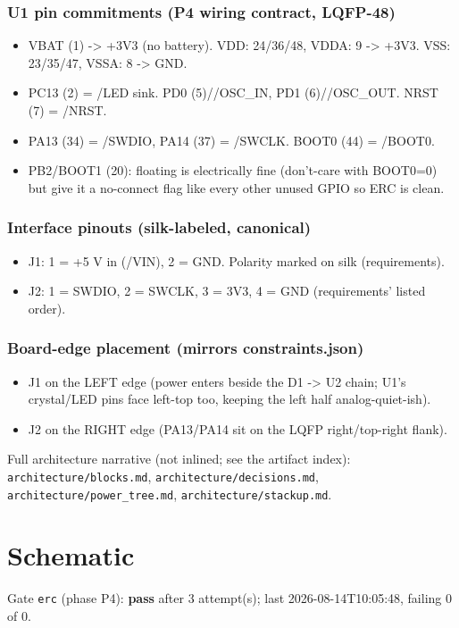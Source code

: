 \documentclass[11pt,a4paper]{article}
\begin{document}
\subsubsection*{U1 pin commitments (P4 wiring contract, LQFP-48)}
\begin{itemize}
\item VBAT (1) -\textgreater{} +3V3 (no battery). VDD: 24/36/48, VDDA: 9 -\textgreater{} +3V3.
VSS: 23/35/47, VSSA: 8 -\textgreater{} GND.
\item PC13 (2) = /LED sink. PD0 (5)//OSC\_IN, PD1 (6)//OSC\_OUT. NRST (7) = /NRST.
\item PA13 (34) = /SWDIO, PA14 (37) = /SWCLK. BOOT0 (44) = /BOOT0.
\item PB2/BOOT1 (20): floating is electrically fine (don't-care with BOOT0=0) but
give it a no-connect flag like every other unused GPIO so ERC is clean.
\end{itemize}
\subsubsection*{Interface pinouts (silk-labeled, canonical)}
\begin{itemize}
\item J1: 1 = +5 V in (/VIN), 2 = GND. Polarity marked on silk (requirements).
\item J2: 1 = SWDIO, 2 = SWCLK, 3 = 3V3, 4 = GND (requirements' listed order).
\end{itemize}
\subsubsection*{Board-edge placement (mirrors constraints.json)}
\begin{itemize}
\item J1 on the LEFT edge (power enters beside the D1 -\textgreater{} U2 chain; U1's
crystal/LED pins face left-top too, keeping the left half analog-quiet-ish).
\item J2 on the RIGHT edge (PA13/PA14 sit on the LQFP right/top-right flank).
\end{itemize}
Full architecture narrative (not inlined; see the artifact index): \texttt{architecture/blocks.md}, \texttt{architecture/decisions.md}, \texttt{architecture/power\_tree.md}, \texttt{architecture/stackup.md}.
\section{Schematic}
Gate \texttt{erc} (phase P4): \textbf{pass} after 3 attempt(s); last 2026-08-14T10:05:48, failing 0 of 0.
\end{document}
